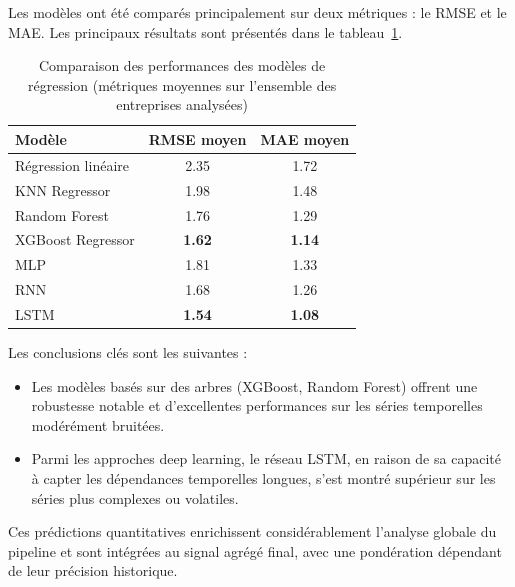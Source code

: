 \documentclass[a4paper,12pt]{article}
\begin{document}
Les modèles ont été comparés principalement sur deux métriques : le RMSE et le MAE. Les principaux résultats sont présentés dans le tableau~\ref{tab:regression_perf}.

\begin{table}[h!]
\centering
\begin{tabular}{|l|c|c|}
\hline
\textbf{Modèle} & \textbf{RMSE moyen} & \textbf{MAE moyen} \\
\hline
Régression linéaire & 2.35 & 1.72 \\
KNN Regressor & 1.98 & 1.48 \\
Random Forest & 1.76 & 1.29 \\
XGBoost Regressor & \textbf{1.62} & \textbf{1.14} \\
MLP & 1.81 & 1.33 \\
RNN & 1.68 & 1.26 \\
LSTM & \textbf{1.54} & \textbf{1.08} \\
\hline
\end{tabular}
\caption{Comparaison des performances des modèles de régression (métriques moyennes sur l'ensemble des entreprises analysées)}
\label{tab:regression_perf}
\end{table}

Les conclusions clés sont les suivantes :
\begin{itemize}
    \item Les modèles basés sur des arbres (XGBoost, Random Forest) offrent une robustesse notable et d'excellentes performances sur les séries temporelles modérément bruitées.
    \item Parmi les approches deep learning, le réseau LSTM, en raison de sa capacité à capter les dépendances temporelles longues, s'est montré supérieur sur les séries plus complexes ou volatiles.
\end{itemize}

Ces prédictions quantitatives enrichissent considérablement l’analyse globale du pipeline et sont intégrées au signal agrégé final, avec une pondération dépendant de leur précision historique.
\end{document}
